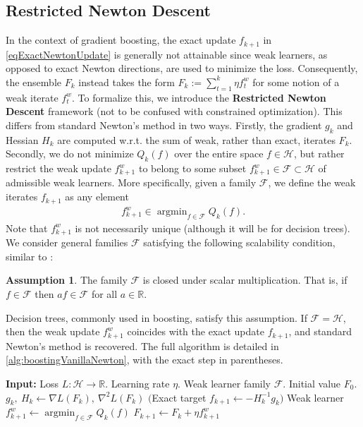 \documentclass{article}
\theoremstyle{plain}
\theoremstyle{definition}
\newtheorem{assumption}[theorem]{Assumption}
\theoremstyle{remark}
\newcommand{\bbR}{\mathbb{R}}
\DeclareMathOperator*{\argmin}{argmin}
\begin{document}
\subsection{Restricted Newton Descent}
In the context of gradient boosting, the exact update $f_{k+1}$ in \eqref{eqExactNewtonUpdate} is generally not attainable since weak learners, as opposed to exact Newton directions, are used to minimize the loss. Consequently, the ensemble $F_k$ instead takes the form $F_k := \sum_{t=1}^k \eta f_t^w$ for some notion of a weak iterate $f^w_t$. To formalize this, we introduce the \textbf{Restricted Newton Descent} framework (not to be confused with constrained optimization). This differs from standard Newton's method in two ways. Firstly, the gradient $g_k$ and Hessian $H_k$ are computed w.r.t. the sum of weak, rather than exact, iterates $F_k$. Secondly, we do not minimize $Q_k(f)$ over the entire space $f \in \mathcal{H}$, but rather restrict the weak update $f_{k+1}^w$ to belong to some subset $f_{k+1}^w \in \mathcal{F} \subset \mathcal{H}$ of admissible weak learners. More specifically, given a family $\mathcal{F}$, we define the weak iterates $f_{k+1}$ as any element
\begin{align}\label{eqWeakNewtonUpdate}
    f_{k+1}^w  \in  \argmin_{f \in \mathcal{F}} Q_k(f).
\end{align}
Note that $f_{k+1}^w$ is not necessarily unique (although it will be for decision trees). We consider general families $\mathcal{F}$ satisfying the following scalability condition, similar to \citet{2020AcceleratingGradientBoostingMachines}:
\begin{assumption}
    The family $\mathcal{F}$ is closed under scalar multiplication. That is, if $f \in \mathcal{F}$ then $a f \in \mathcal{F}$ for all $a\in\mathbb{R}$.
\end{assumption}
Decision trees, commonly used in boosting, satisfy this assumption. If $\mathcal{F} = \mathcal{H}$, then the weak update $f^w_{k+1}$ coincides with the exact update $f_{k+1}$, and standard Newton's method is recovered. The full algorithm is detailed in \cref{alg:boostingVanillaNewton}, with the exact step in parentheses.

\begin{algorithm}[H]
\caption{Vanilla Restricted Newton}
\label{alg:boostingVanillaNewton}
\begin{algorithmic}[1]
    \STATE \textbf{Input:} Loss $L:\mathcal{H}\to\bbR$. Learning rate $\eta$. Weak learner family $\mathcal{F}$. Initial value $F_0$.
        \STATE $g_k, \: H_k \leftarrow \nabla L(F_k), \: \nabla^2L(F_k)$
        \STATE $\big($Exact target $f_{k+1} \leftarrow - H_k^{-1}g_k \big)$
        \STATE Weak learner $f^{w}_{k+1} \leftarrow \argmin_{f \in \mathcal{F}} Q_k(f)$
        \STATE $F_{k+1} \leftarrow F_k + \eta f^{w}_{k+1}$
    \ENDFOR
\end{algorithmic}
\end{algorithm}
\end{document}
